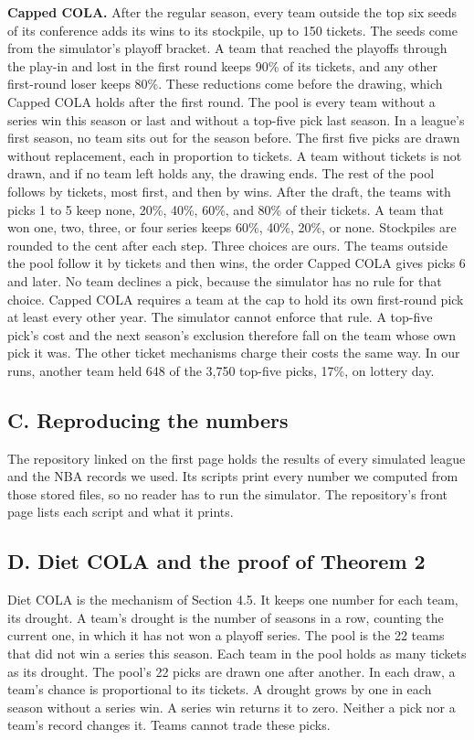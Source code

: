 \documentclass[11pt,letterpaper]{article}
\begin{document}
\textbf{Capped COLA.} After the regular season, every team outside the top six seeds of its conference adds its wins to its stockpile, up to 150 tickets. The seeds come from the simulator's playoff bracket. A team that reached the playoffs through the play-in and lost in the first round keeps 90\% of its tickets, and any other first-round loser keeps 80\%. These reductions come before the drawing, which Capped COLA holds after the first round. The pool is every team without a series win this season or last and without a top-five pick last season. In a league's first season, no team sits out for the season before. The first five picks are drawn without replacement, each in proportion to tickets. A team without tickets is not drawn, and if no team left holds any, the drawing ends. The rest of the pool follows by tickets, most first, and then by wins. After the draft, the teams with picks 1 to 5 keep none, 20\%, 40\%, 60\%, and 80\% of their tickets. A team that won one, two, three, or four series keeps 60\%, 40\%, 20\%, or none. Stockpiles are rounded to the cent after each step. Three choices are ours. The teams outside the pool follow it by tickets and then wins, the order Capped COLA gives picks 6 and later. No team declines a pick, because the simulator has no rule for that choice. Capped COLA requires a team at the cap to hold its own first-round pick at least every other year. The simulator cannot enforce that rule. A top-five pick's cost and the next season's exclusion therefore fall on the team whose own pick it was. The other ticket mechanisms charge their costs the same way. In our runs, another team held 648 of the 3,750 top-five picks, 17\%, on lottery day.

\subsection*{C. Reproducing the numbers}

The repository linked on the first page holds the results of every simulated league and the NBA records we used. Its scripts print every number we computed from those stored files, so no reader has to run the simulator. The repository's front page lists each script and what it prints.

\subsection*{D. Diet COLA and the proof of Theorem 2}

Diet COLA is the mechanism of Section 4.5. It keeps one number for each team, its drought. A team's drought is the number of seasons in a row, counting the current one, in which it has not won a playoff series. The pool is the 22 teams that did not win a series this season. Each team in the pool holds as many tickets as its drought. The pool's 22 picks are drawn one after another. In each draw, a team's chance is proportional to its tickets. A drought grows by one in each season without a series win. A series win returns it to zero. Neither a pick nor a team's record changes it. Teams cannot trade these picks.
\end{document}
